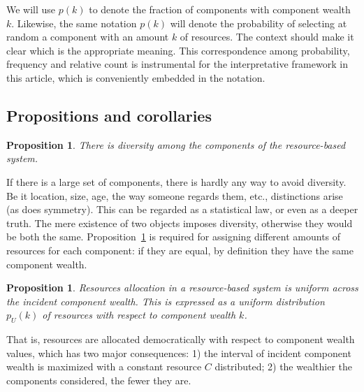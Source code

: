 \documentclass[a4paper, 11pt]{article} %
\newtheorem{proposition}[theorem]{Proposition}
\begin{document}
We will use $p(k)$ to denote the fraction of components with component wealth $k$. Likewise, the same notation $p(k)$ will denote the probability of selecting at random a component with an amount $k$ of resources.
The context should make it clear which is the appropriate meaning.
This correspondence among probability, frequency and relative count is
instrumental for the interpretative framework in this article,
which is conveniently embedded in the notation.



\subsection{Propositions and corollaries}\label{propCol}

\setcounter{theorem}{-1}
\begin{proposition}\label{prop:0}
	There is diversity among the components of the resource-based system.
\end{proposition}

If there is a large set of components, there is hardly any way to avoid diversity. Be it location, size, age, the way someone regards them, etc., distinctions arise (as does symmetry). This can be regarded as a statistical law, or even as a deeper truth.
The mere existence of two objects imposes diversity, otherwise they would be both the same. Proposition~\ref{prop:0} is required for assigning different amounts of resources for each component: if they are equal, by definition they have the same component wealth.

\begin{proposition}\label{prop:2}
	Resources allocation in a resource-based system is uniform across the incident component wealth. This is expressed as a uniform distribution $p_U(k)$ of resources with respect to component wealth $k$.
\end{proposition}

That is, resources are allocated democratically with respect to component wealth values, which has two major consequences: 1) the interval of incident component wealth is maximized with a constant resource $C$ distributed; 
2) the wealthier the components considered, the fewer they are. 
\end{document}

